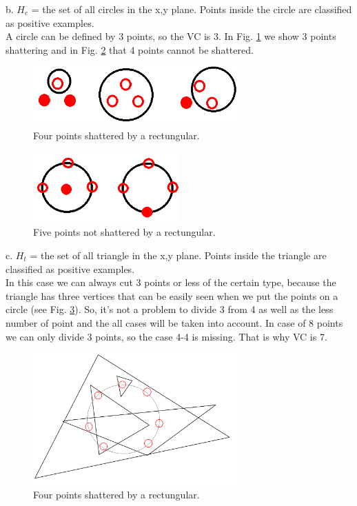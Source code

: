 \documentclass[a4paper, 12pt]{article}
\begin{document}
b. $H_c$ = the set of all circles in the x,y plane. Points inside the circle are classified as positive examples.\\

A circle can be defined by 3 points, so the VC is 3. In Fig. \ref{fig:CirclePoints} we show 3 points shattering and in Fig. \ref{fig:Circle5Points} that 4 points cannot be shattered.

\begin{figure}[h]
  \centering
  \caption{Four points shattered by a rectungular.\label{fig:CirclePoints}}
  \includegraphics[width=0.7\textwidth]{CirclePoints}
\end{figure}

\begin{figure}[h]
  \centering
  \caption{Five points not shattered by a rectungular.\label{fig:Circle5Points}}
  \includegraphics[width=0.5\textwidth]{Circle5Points}
\end{figure}


c. $H_t$ = the set of all triangle in the x,y plane. Points inside the triangle are classified as positive examples.\\

In this case we can always cut 3 points or less of the certain type, because the triangle has three vertices that can be easily seen when we put the points on a circle (see Fig. \ref{fig:TriPoints}). So, it's not a problem to divide 3 from 4 as well as the less number of point and the all cases will be taken into account. In case of 8 points we can only divide 3 points, so the case 4-4 is missing. That is why VC is 7.

\begin{figure}[h]
  \centering
  \caption{Four points shattered by a rectungular.\label{fig:TriPoints}}
  \includegraphics[width=0.7\textwidth]{TriPoints}
\end{figure}
\end{document}
